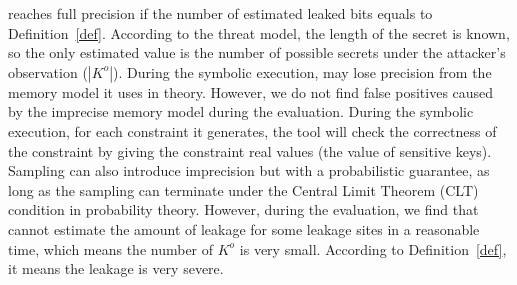 \tool{} reaches full precision if the number of estimated leaked bits 
equals to Definition~\ref{def}. According to the threat model, the 
length of the secret is known, so the only estimated value is the number
of possible secrets under the attacker's observation ($|K^o|$). 
During the symbolic execution, \tool{} may lose precision from the 
memory model it uses in theory. However, we do not find false positives 
caused by the imprecise memory model during the evaluation. 
During the symbolic execution, for each constraint it generates,
the tool will check the correctness of the constraint by giving 
the constraint real values (the value of sensitive keys). Sampling 
can also introduce imprecision but with a probabilistic guarantee, 
as long as the sampling can terminate under the Central Limit Theorem (CLT) condition 
in probability theory. 
However, during the evaluation, we find that \tool{} cannot estimate 
the amount of leakage for some leakage sites in a reasonable time, 
which means the number of $K^o$ is very small. According to Definition~\ref{def}, 
it means the leakage is very severe.

